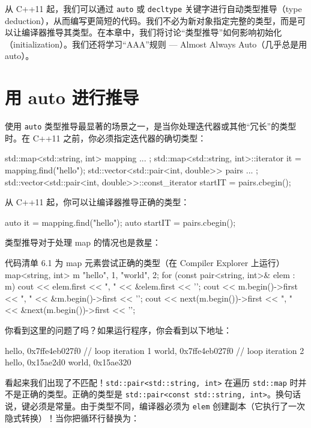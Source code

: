 从 C++11 起，我们可以通过 \texttt{auto} 或 \texttt{decltype} 关键字进行自动类型推导（type deduction），从而编写更简短的代码。我们不必为新对象指定完整的类型，而是可以让编译器推导其类型。在本章中，我们将讨论“类型推导”如何影响初始化（initialization）。我们还将学习“AAA”规则 — Almost Always Auto（几乎总是用 auto）。

\section{用 auto 进行推导}

使用 \texttt{auto} 类型推导最显著的场景之一，是当你处理迭代器或其他“冗长”的类型时。在 C++11 之前，你必须指定迭代器的确切类型：

\begin{codebox}[cpp]
std::map<std::string, int> mapping { ... };
std::map<std::string, int>::iterator it = mapping.find("hello");
std::vector<std::pair<int, double>> pairs { ... };
std::vector<std::pair<int, double>>::const_iterator startIT = pairs.cbegin();
\end{codebox}

从 C++11 起，你可以让编译器推导正确的类型：

\begin{codebox}[cpp]
auto it = mapping.find("hello");
auto startIT = pairs.cbegin();
\end{codebox}

类型推导对于处理 map 的情况也是救星：

\begin{codeboxt}[cpp]{代码清单 6.1 为 map 元素尝试正确的类型（在 Compiler Explorer 上运行）}
map<string, int> m { {"hello", 1}, {"world", 2}};
for (const pair<string, int>& elem : m)
cout << elem.first << ", " << &elem.first << '\n';
cout << m.begin()->first << ", " << &m.begin()->first << '\n';
cout << next(m.begin())->first << ", " << &next(m.begin())->first << '\n';
\end{codeboxt}

你看到这里的问题了吗？如果运行程序，你会看到以下地址：

\begin{codebox}[cpp]
hello, 0x7ffe4eb027f0 // loop iteration 1
world, 0x7ffe4eb027f0 // loop iteration 2
hello, 0x15ae2d0
world, 0x15ae320
\end{codebox}

看起来我们出现了不匹配！\texttt{std::pair<std::string, int>} 在遍历 \texttt{std::map} 时并不是正确的类型。正确的类型是 \texttt{std::pair<const std::string, int>}。换句话说，键必须是常量。由于类型不同，编译器必须为 \texttt{elem} 创建副本（它执行了一次隐式转换）！当你把循环行替换为：

